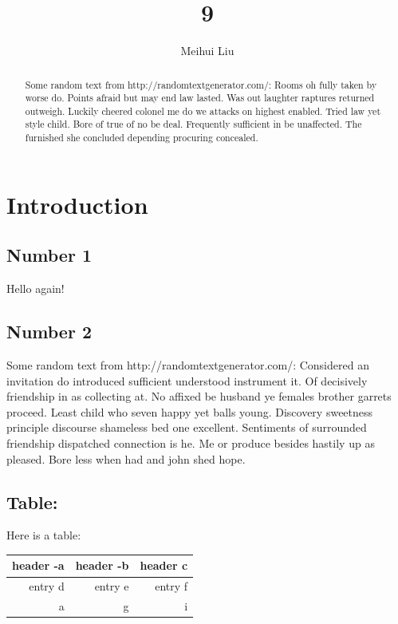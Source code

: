 \documentclass[letterpaper, notitlepage, 12pt]{article}
\begin{document}
\title{9}
\author{Meihui Liu}
\maketitle

\begin{abstract}
Some random text from http://randomtextgenerator.com/:
Rooms oh fully taken by worse do. Points afraid but may end law lasted. Was out laughter raptures returned outweigh. Luckily cheered colonel me do we attacks on highest enabled. Tried law yet style child. Bore of true of no be deal. Frequently sufficient in be unaffected. The furnished she concluded depending procuring concealed. 
\end{abstract}

\section{Introduction}

\subsection{Number 1}

Hello again!

\subsection{Number 2}

Some random text from http://randomtextgenerator.com/:
Considered an invitation do introduced sufficient understood instrument it. Of decisively friendship in as collecting at. No affixed be husband ye females brother garrets proceed. Least child who seven happy yet balls young. Discovery sweetness principle discourse shameless bed one excellent. Sentiments of surrounded friendship dispatched connection is he. Me or produce besides hastily up as pleased. Bore less when had and john shed hope. 

\subsection{Table:}
Here is a table:\\
\begin{tabular}{r||r|r}
header -a & header -b & header c \\
\hline \hline
entry d & entry e & entry f \\
\hline
a & g & i
\end{tabular}
\end{document}
